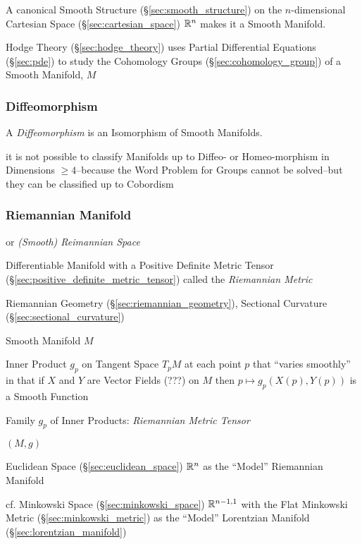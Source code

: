 A canonical Smooth Structure (\S\ref{sec:smooth_structure}) on the
$n$-dimensional Cartesian Space (\S\ref{sec:cartesian_space}) $\mathbb{R}^n$ makes
it a Smooth Manifold.

\fist Hodge Theory (\S\ref{sec:hodge_theory}) uses Partial Differential
Equations (\S\ref{sec:pde}) to study the Cohomology Groups
(\S\ref{sec:cohomology_group}) of a Smooth Manifold, $M$



\subsubsection{Diffeomorphism}\label{sec:diffeomorphism}

A \emph{Diffeomorphism} is an Isomorphism of Smooth Manifolds.

it is not possible to classify Manifolds up to Diffeo- or Homeo-morphism in
Dimensions $\geq 4$--because the Word Problem for Groups cannot be solved--but
they can be classified up to Cobordism




\subsubsection{Riemannian Manifold}\label{sec:riemannian_manifold}


or \emph{(Smooth) Reimannian Space}

Differentiable Manifold with a Positive Definite Metric Tensor
(\S\ref{sec:positive_definite_metric_tensor}) called the
\emph{Riemannian Metric}

Riemannian Geometry (\S\ref{sec:riemannian_geometry}), Sectional Curvature
(\S\ref{sec:sectional_curvature})

Smooth Manifold $M$

Inner Product $g_p$ on Tangent Space $T_pM$ at each point $p$ that
``varies smoothly'' in that if $X$ and $Y$ are Vector Fields (???) on
$M$ then $p \mapsto g_p(X(p),Y(p))$ is a Smooth Function %

Family $g_p$ of Inner Products: \emph{Riemannian Metric Tensor}

$(M,g)$

Euclidean Space (\S\ref{sec:euclidean_space}) $\mathbb{R}^n$ as the
``Model'' Riemannian Manifold

cf. Minkowski Space (\S\ref{sec:minkowski_space}) $\mathbb{R}^{n-1,1}$
with the Flat Minkowski Metric (\S\ref{sec:minkowski_metric}) as the
``Model'' Lorentzian Manifold (\S\ref{sec:lorentzian_manifold})

